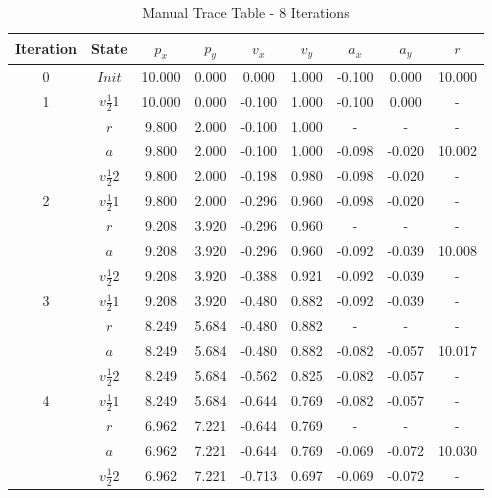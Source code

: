 \begin{table}[H]
\footnotesize
\centering
\caption{Manual Trace Table - 8 Iterations}
\def\arraystretch{1.4}
\begin{tabular}{|c|c|c|c|c|c|c|c|c|} \hline
Iteration & State    &   $p_x$ &  $p_y$ &  $v_x$ &  $v_y$ &  $a_x$ &  $a_y$ &  $r$   \\ \hline
0 & $Init$           &  10.000 &	0.000 &	 0.000 &	1.000 &	-0.100 &  0.000 & 10.000 \\ \hline
1 & $v\frac{1}{2}1$	 &  10.000 &  0.000 &	-0.100 &	1.000 &	-0.100 &  0.000 & -      \\ \hline
  & $r$	             &   9.800 &	2.000	& -0.100 & 	1.000	&	-	     & -      & -      \\ \hline
  & $a$	             &   9.800 &	2.000 &	-0.100 &	1.000 &	-0.098 & -0.020 &	10.002 \\ \hline
  & $v\frac{1}{2}2$	 &   9.800 &	2.000 &	-0.198 &	0.980 &	-0.098 & -0.020	& -      \\ \hline
2 & $v\frac{1}{2}1$	 &   9.800 &	2.000 &	-0.296 &	0.960 &	-0.098 & -0.020	& -      \\ \hline
  & $r$	             &   9.208 &	3.920 &	-0.296 &	0.960	&	-	     & -      & -      \\ \hline
  & $a$	             &   9.208 &	3.920 &	-0.296 &	0.960 &	-0.092 & -0.039 &	10.008 \\ \hline
  & $v\frac{1}{2}2$  &	 9.208 &	3.920 &	-0.388 &	0.921 &	-0.092 & -0.039	& -      \\ \hline
3 & $v\frac{1}{2}1$  &	 9.208 &	3.920	& -0.480 &	0.882 &	-0.092 & -0.039 &	-      \\ \hline
  & $r$              & 	 8.249 &	5.684	& -0.480 &	0.882 &	-		   & -      & -      \\ \hline
  & $a$              &	 8.249 &	5.684	& -0.480 &	0.882	& -0.082 & -0.057	& 10.017 \\ \hline
  & $v\frac{1}{2}2$  &	 8.249 &	5.684	& -0.562 &	0.825	& -0.082 & -0.057	& -      \\ \hline
4 & $v\frac{1}{2}1$  &	 8.249 &	5.684	& -0.644 &	0.769	& -0.082 & -0.057	& -      \\ \hline
  & $r$	             &   6.962 &	7.221	& -0.644 &	0.769	&	-	     & -      & -      \\ \hline
  & $a$              &   6.962 &	7.221	& -0.644 &	0.769	& -0.069 & -0.072 &	10.030 \\ \hline
  & $v\frac{1}{2}2$  &	 6.962 &	7.221 &	-0.713 &	0.697 &	-0.069 & -0.072	& -      \\ \hline

\end{tabular}
\end{table}
